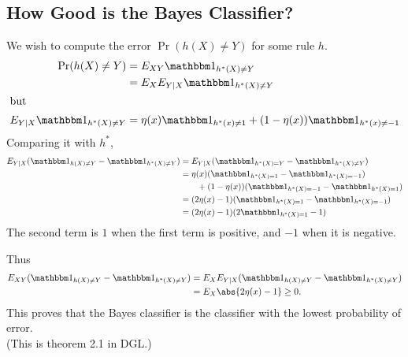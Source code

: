 \subsection{How Good is the Bayes Classifier?} \label{sec:goodness}
We wish to compute the error $\Pr(h(X) \ne Y)$ for some rule $h$.
\begin{align*}
    \Pr(h(X) \ne Y)
        &= E_{XY} \ind{h^*(X) \ne Y} \\
        &= E_X E_{Y \mid X} \ind{h^*(X) \ne Y} \\
    \intertext{but}
    E_{Y \mid X} \ind{h^*(X) \ne Y}
        &= \eta(x) \ind{h^*(x) \ne 1} + (1 - \eta(x)) \ind{h^*(x) \ne -1}
\end{align*}
Comparing it with $h^*$,
\begin{align*}
    E_{Y \mid X} (\ind{h(X) \ne Y} - \ind{h^*(X) \ne Y})
        &= E_{Y \given X} (\ind{h^*(X) = Y} - \ind{h^*(X) \ne Y}) \\
        &= \eta(x) (\ind{h^*(X) = 1} - \ind{h^*(X) = -1}) \\
        &\qquad + (1 - \eta(x)) (\ind{h^*(X) = -1} - \ind{h^*(X) = 1}) \\
        &= (2 \eta(x) - 1)(\ind{h^*(X) = 1} - \ind{h^*(X) = -1}) \\
        &= (2 \eta(x) - 1)(2 \ind{h^*(X) = 1} - 1)
\end{align*}
The second term is $1$ when the first term is positive, and $-1$ when it is
negative.

Thus \begin{align*}
    E_{XY} (\ind{h(X) \ne Y} - \ind{h^*(X) \ne Y})
        &= E_X E_{Y \mid X} (\ind{h(X) \ne Y} - \ind{h^*(X) \ne Y}) \\
        &= E_X \abs{2 \eta(x) - 1} \ge 0.
\end{align*}
This proves that the Bayes classifier is the classifier with the lowest
probability of error. \\
(This is theorem 2.1 in DGL.)
